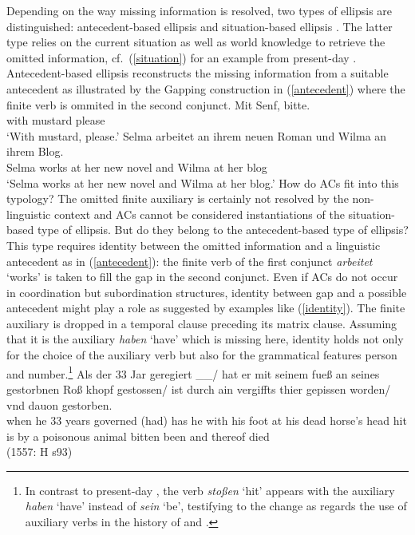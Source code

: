 \documentclass[output=paper,colorlinks,citecolor=brown]{langscibook}
\begin{document}
Depending on the way missing information is resolved, two types of ellipsis are distinguished: antecedent-based ellipsis and situation-based ellipsis \citep{reich2011}. The latter type relies on the current situation as well as world knowledge to retrieve the omitted information, cf.\ (\ref{situation}) for an example from present-day . Antecedent-based ellipsis reconstructs the missing information from a suitable antecedent as illustrated by the Gapping construction in (\ref{antecedent}) where the finite verb is ommited in the second conjunct.
\eal
\ex \label{situation}
\gll Mit Senf, bitte.  \\ with mustard please   \\
\glt `With mustard, please.'
\ex  \label{antecedent}
\gll Selma arbeitet an ihrem neuen Roman und Wilma an ihrem Blog. \\ Selma works at her new novel and Wilma at her blog    \\
\glt `Selma works at her new novel and Wilma at her blog.'
\zl
How do ACs fit into this typology? The omitted finite auxiliary is certainly not resolved by the non-linguistic context and ACs cannot be considered instantiations of the situation-based type of ellipsis. But do they belong to the antecedent-based type of ellipsis? This type requires identity between the omitted information and a linguistic antecedent as in (\ref{antecedent}): the finite verb of the first conjunct \textit{arbeitet} `works' is taken to fill the gap in the second conjunct. Even if ACs do not occur in coordination but subordination structures, identity between gap and a possible antecedent might play a role as suggested by examples like (\ref{identity}). The finite auxiliary is dropped in a temporal clause preceding its matrix clause. Assuming that it is the auxiliary \textit{haben} `have' which is missing here, identity holds not only for the choice of the auxiliary verb but also for the grammatical features person and number.\footnote{In contrast to present-day , the verb \textit{stoßen} `hit' appears with the auxiliary \textit{haben} `have' instead of \textit{sein} `be', testifying to the change as regards the use of auxiliary verbs in the history of   \textcite[387]{ERSW93} and \textcite{sapp2011a}.}
\ea \label{identity}
\gll Als der 33 Jar geregiert \_\_/ hat er mit seinem fueß an seines gestorbnen Roß khopf gestossen/ ist durch ain vergiffts thier gepissen worden/ vnd dauon gestorben. \\ when he 33 years governed (had) has he with his foot at his dead horse's head hit is by a poisonous animal bitten been and thereof died  \\  \hfill (1557: H s93)
\end{document}
